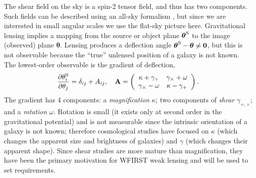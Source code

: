The shear field on the sky is a spin-2 tensor field, and thus has two components. Such fields can be described using an all-sky formalism \citep{1997PhRvD..55.1830Z, 1997PhRvD..55.7368K}, but since we are interested in small angular scales we use the flat-sky picture here. Gravitational lensing implies a mapping from the source or object plane ${\boldsymbol\theta}^{\rm S}$ to the image (observed) plane ${\boldsymbol\theta}$. Lensing produces a deflection angle ${\boldsymbol\theta}^{\rm S}-{\boldsymbol\theta}\neq{\boldsymbol 0}$, but this is not observable because the ``true'' unlensed position of a galaxy is not known. The lowest-order observable is the gradient of deflection,
\begin{equation}
\frac{\partial \theta^{\rm S}_i}{\partial \theta_j} = \delta_{ij}+A_{ij}, ~~~ {\bf A} = \left(\begin{array}{cc} \kappa+\gamma_+ & \gamma_\times+\omega \\ \gamma_\times-\omega & \kappa-\gamma_+ \end{array} \right).
\end{equation}
The gradient has 4 components: a {\em magnification} $\kappa$; two components of {\em shear} $\gamma_{+,\times}$; and a {\em rotation} $\omega$. Rotation is small (it exists only at second order in the gravitational potential) and is not measurable since the intrinsic orientation of a galaxy is not known; therefore cosmological studies have focused on $\kappa$ (which changes the apparent size and brightness of galaxies) and $\gamma$ (which changes their apparent shape). Since shear studies are more mature than magnification, they have been the primary motivation for WFIRST weak lensing and will be used to set requirements.

